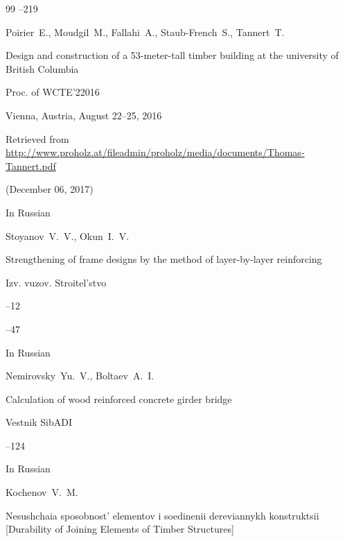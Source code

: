 \begin{thebibliography}{99}
--219





\by Poirier~E., Moudgil~M., Fallahi~A., Staub-French~S., Tannert~T. 

\paper Design and construction of a 53-meter-tall timber building at the university of British Columbia

\inbook Proc. of WCTE'22016



\procinfo  Vienna, Austria, August 22--25, 2016

\elink Retrieved from \url{http://www.proholz.at/fileadmin/proholz/media/documents/Thomas-Tannert.pdf}

(December 06, 2017) 




\lang In Russian

\by Stoyanov~V.~V., Okun~I.~V.

\paper Strengthening  of  frame  designs by the method of layer-by-layer reinforcing 

\jour Izv. vuzov. Stroitel'stvo


--12

--47








\lang In Russian

\by Nemirovsky~Yu.~V., Boltaev~A.~I.

\paper Calculation of wood reinforced concrete girder bridge

\jour Vestnik SibADI



--124










\lang In Russian

\by Kochenov~V.~M.

\book Nesushchaia sposobnost' elementov i soedinenii dereviannykh konstruktsii \rm [Durability of Joining Elements of Timber Structures]


\end{thebibliography}
